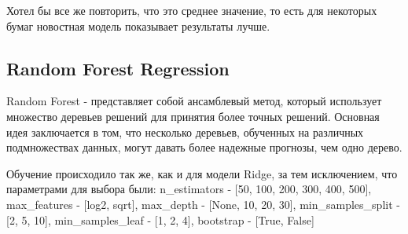 \documentclass[12pt, a4paper]{article}
\begin{document}
Хотел бы все же повторить, что это среднее значение, то есть для некоторых бумаг новостная модель показывает результаты лучше.

\subsection{Random Forest Regression}

Random Forest - представляет собой ансамблевый метод, который использует множество деревьев решений для принятия более точных решений. Основная идея заключается в том, что несколько деревьев, обученных на различных подмножествах данных, могут давать более надежные прогнозы, чем одно дерево.

Обучение происходило так же, как и для модели Ridge, за тем исключением, что параметрами для выбора были: n\_estimators - [50, 100, 200, 300, 400, 500], max\_features - [log2, sqrt], max\_depth - [None, 10, 20, 30], min\_samples\_split - [2, 5, 10], min\_samples\_leaf - [1, 2, 4], bootstrap - [True, False]
\end{document}
